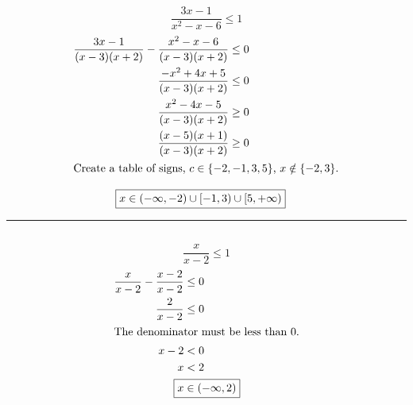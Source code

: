	\subsection{}
		\[\frac{3x - 1}{x^2 - x - 6} \leq 1\]
		\begin{align*}
			\frac{3x - 1}{(x - 3)(x + 2)} - \frac{x^2 - x - 6}{(x - 3)(x + 2)} &\leq 0 \\
			\frac{-x^2 + 4x + 5}{(x - 3)(x + 2)} &\leq 0 \\
			\frac{x^2 - 4x - 5}{(x - 3)(x + 2)} &\geq 0 \\
			\frac{(x - 5)(x + 1)}{(x - 3)(x + 2)} &\geq 0 \\
			\intertext{Create a table of signs, $c \in \{-2, -1, 3, 5\}$, $x \notin \{-2, 3\}$.}
		\end{align*}
		\begin{center}\end{center}
		\begin{align*}
			\Aboxed{x &\in (-\infty, -2) \cup [-1, 3) \cup [5, +\infty)}
		\end{align*}
		\hrule{}

	\subsection{}
		\[\frac{x}{x - 2} \leq 1\]
		\begin{align*}
			\frac{x}{x - 2} - \frac{x - 2}{x - 2} &\leq 0 \\
			\frac{2}{x - 2} &\leq 0 \\
			\intertext{The denominator must be less than 0.}
			x - 2 &< 0 \\
			x &< 2 \\
			\Aboxed{x &\in (-\infty, 2)}
		\end{align*}
		\pagebreak{}

